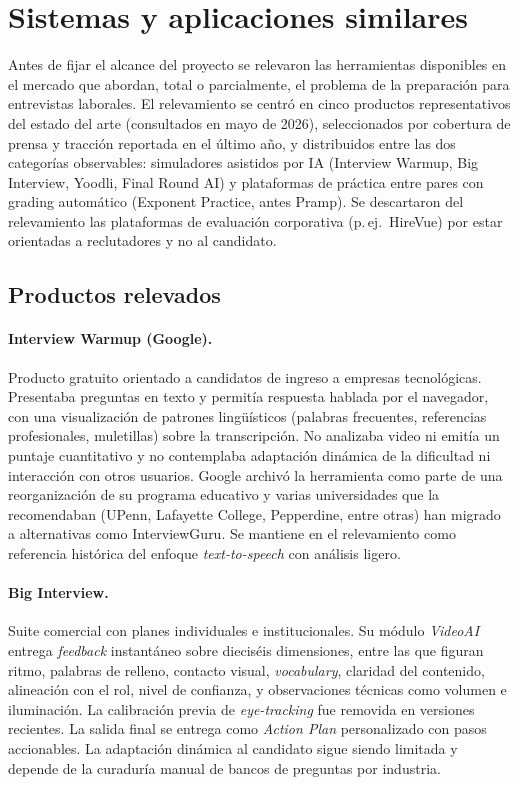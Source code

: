 \section{Sistemas y aplicaciones similares}
\label{sec:similares}

Antes de fijar el alcance del proyecto se relevaron las herramientas
disponibles en el mercado que abordan, total o parcialmente, el problema
de la preparación para entrevistas laborales. El relevamiento se centró
en cinco productos representativos del estado del arte (consultados en
mayo de 2026), seleccionados por cobertura de prensa y tracción
reportada en el último año, y distribuidos entre las dos categorías
observables: simuladores asistidos por IA (Interview Warmup, Big
Interview, Yoodli, Final Round AI) y plataformas de práctica entre
pares con grading automático (Exponent Practice, antes Pramp). Se
descartaron del relevamiento las plataformas de evaluación corporativa
(p.\,ej.\ HireVue) por estar orientadas a reclutadores y no al
candidato.

\subsection{Productos relevados}

\paragraph{Interview Warmup (Google).} Producto gratuito orientado a
candidatos de ingreso a empresas tecnológicas. Presentaba preguntas en
texto y permitía respuesta hablada por el navegador, con una
visualización de patrones lingüísticos (palabras frecuentes,
referencias profesionales, muletillas) sobre la transcripción. No
analizaba video ni emitía un puntaje cuantitativo y no contemplaba
adaptación dinámica de la dificultad ni interacción con otros usuarios.
Google archivó la herramienta como parte de una reorganización de su
programa educativo y varias universidades que la recomendaban (UPenn,
Lafayette College, Pepperdine, entre otras) han migrado a alternativas
como InterviewGuru. Se mantiene en el relevamiento como referencia
histórica del enfoque \textit{text-to-speech} con análisis ligero.

\paragraph{Big Interview.} Suite comercial con planes individuales e
institucionales. Su módulo \textit{VideoAI} entrega
\textit{feedback} instantáneo sobre dieciséis dimensiones, entre las
que figuran ritmo, palabras de relleno, contacto visual,
\textit{vocabulary}, claridad del contenido, alineación con el rol,
nivel de confianza, y observaciones técnicas como volumen e
iluminación. La calibración previa de \textit{eye-tracking} fue
removida en versiones recientes. La salida final se entrega como
\textit{Action Plan} personalizado con pasos accionables. La
adaptación dinámica al candidato sigue siendo limitada y depende de
la curaduría manual de bancos de preguntas por industria.

